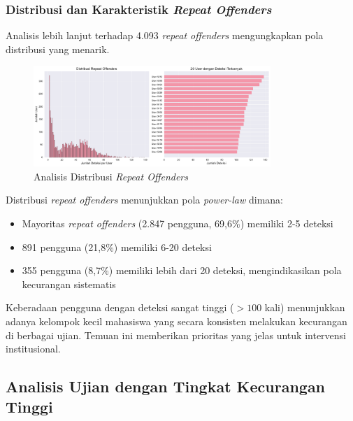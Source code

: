 \subsubsection{Distribusi dan Karakteristik \textit{Repeat Offenders}}

Analisis lebih lanjut terhadap 4.093 \textit{repeat offenders} mengungkapkan pola distribusi yang menarik.

\begin{figure}[htbp]
    \centering
    \includegraphics[width=0.8\textwidth]{figures/repeat_offender_analysis.pdf}
    \caption{Analisis Distribusi \textit{Repeat Offenders}}
    \label{fig:repeatOffenderAnalysis}
\end{figure}

Distribusi \textit{repeat offenders} menunjukkan pola \textit{power-law} dimana:
\begin{itemize}
    \item Mayoritas \textit{repeat offenders} (2.847 pengguna, 69,6\%) memiliki 2-5 deteksi
    \item 891 pengguna (21,8\%) memiliki 6-20 deteksi
    \item 355 pengguna (8,7\%) memiliki lebih dari 20 deteksi, mengindikasikan pola kecurangan sistematis
\end{itemize}

Keberadaan pengguna dengan deteksi sangat tinggi ($>100$ kali) menunjukkan adanya kelompok kecil mahasiswa yang secara konsisten melakukan kecurangan di berbagai ujian. Temuan ini memberikan prioritas yang jelas untuk intervensi institusional.

\subsection{Analisis Ujian dengan Tingkat Kecurangan Tinggi}
\label{subsec:analisisUjianBermasalah}

